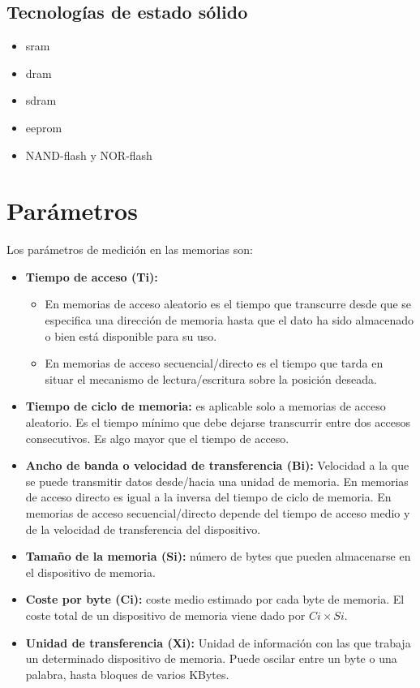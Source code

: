 \subsection{Tecnologías de estado sólido}
\begin{itemize}
	\item \gls{sram}
	\item \gls{dram}
	\item \gls{sdram}
	\item \gls{eeprom}
	\item NAND-flash y NOR-flash
\end{itemize}


\section{Parámetros}

Los parámetros de medición en las memorias son:
\begin{itemize}
	\item\textbf{Tiempo de acceso (Ti):}
	      \begin{itemize}
		      \item En memorias de acceso aleatorio es el tiempo que transcurre desde que se especifica una dirección de memoria hasta que el dato ha sido almacenado o bien está disponible para su uso.
		      \item En memorias de acceso secuencial/directo es el tiempo que tarda en situar el mecanismo de lectura/escritura sobre la posición deseada.
	      \end{itemize}
	\item\textbf{Tiempo de ciclo de memoria:} es aplicable solo a memorias de acceso aleatorio. Es el tiempo mínimo que debe dejarse transcurrir entre dos accesos consecutivos. Es algo mayor que el tiempo de acceso.
	\item\textbf{Ancho de banda o velocidad de transferencia (Bi):} Velocidad a la que se puede transmitir datos desde/hacia una unidad de memoria. En memorias de acceso directo es igual a la inversa del tiempo de ciclo de memoria. En memorias de acceso secuencial/directo depende del tiempo de acceso medio y de la velocidad de transferencia del dispositivo.
	\item\textbf{Tamaño de la memoria (Si):} número de bytes que pueden almacenarse en el dispositivo de memoria.
	\item\textbf{Coste por byte (Ci):} coste medio estimado por cada byte de memoria. El coste total de un dispositivo de memoria viene dado por $Ci\times Si$.
	\item\textbf{Unidad de transferencia (Xi):} Unidad de información con las que trabaja un determinado dispositivo de memoria. Puede oscilar entre un byte o una palabra, hasta bloques de varios KBytes.
\end{itemize}

